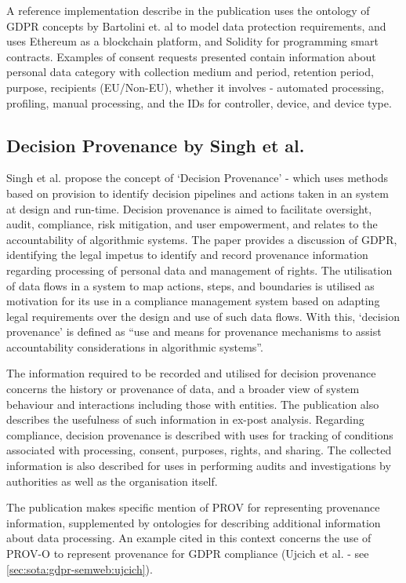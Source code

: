 A reference implementation describe in the publication uses the ontology of GDPR concepts by Bartolini et. al \cite{bartolini_using_2015} to model data protection requirements, and uses Ethereum as a blockchain platform, and Solidity for programming smart contracts. Examples of consent requests presented contain information about personal data category with collection medium and period, retention period, purpose, recipients (EU/Non-EU), whether it involves - automated processing, profiling, manual processing, and the IDs for controller, device, and device type.

\subsection{Decision Provenance by Singh et al.}
Singh et al. propose the concept of `Decision Provenance' - which uses methods based on provision to identify decision pipelines and actions taken in an system at design and run-time. 
Decision provenance is aimed to facilitate oversight, audit, compliance, risk mitigation, and user empowerment, and relates to the accountability of algorithmic systems.
The paper provides a discussion of GDPR, identifying the legal impetus to identify and record provenance information regarding processing of personal data and management of rights. 
The utilisation of data flows in a system to map actions, steps, and boundaries is utilised as motivation for its use in a compliance management system based on adapting legal requirements over the design and use of such data flows. With this, `decision provenance' is defined as ``use and means for provenance mechanisms to assist accountability considerations in algorithmic systems''.

The information required to be recorded and utilised for decision provenance concerns the history or provenance of data, and a broader view of system behaviour and interactions including those with entities. The publication also describes the usefulness of such information in ex-post analysis.
Regarding compliance, decision provenance is described with uses for tracking of conditions associated with processing, consent, purposes, rights, and sharing.
The collected information is also described for uses in performing audits and investigations by authorities as well as the organisation itself.

The publication makes specific mention of PROV \cite{lebo_prov-o:_2013} for representing provenance information, supplemented by ontologies for describing additional information about data processing.
An example cited in this context concerns the use of PROV-O to represent provenance for GDPR compliance (Ujcich et al. \cite{belhajjame_provenance_2018} - see \autoref{sec:sota:gdpr-semweb:ujcich}).

